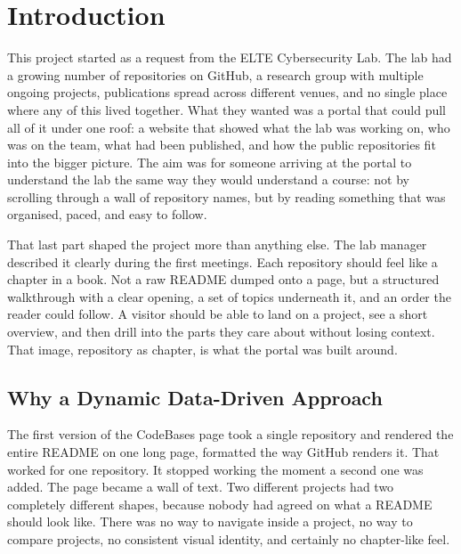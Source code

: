 \chapter{Introduction}\label{ch:intro}

This project started as a request from the ELTE Cybersecurity Lab. The lab had a growing number of repositories on GitHub, a research group with multiple ongoing projects, publications spread across different venues, and no single place where any of this lived together. What they wanted was a portal that could pull all of it under one roof: a website that showed what the lab was working on, who was on the team, what had been published, and how the public repositories fit into the bigger picture. The aim was for someone arriving at the portal to understand the lab the same way they would understand a course: not by scrolling through a wall of repository names, but by reading something that was organised, paced, and easy to follow.

That last part shaped the project more than anything else. The lab manager described it clearly during the first meetings. Each repository should feel like a chapter in a book. Not a raw README dumped onto a page, but a structured walkthrough with a clear opening, a set of topics underneath it, and an order the reader could follow. A visitor should be able to land on a project, see a short overview, and then drill into the parts they care about without losing context. That image, repository as chapter, is what the portal was built around.

\section{Why a Dynamic Data-Driven Approach}\label{sec:intro-dynamic}

The first version of the CodeBases page took a single repository and rendered the entire README on one long page, formatted the way GitHub renders it. That worked for one repository. It stopped working the moment a second one was added. The page became a wall of text. Two different projects had two completely different shapes, because nobody had agreed on what a README should look like. There was no way to navigate inside a project, no way to compare projects, no consistent visual identity, and certainly no chapter-like feel.

